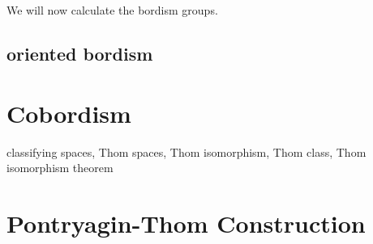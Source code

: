 \documentclass[a4paper,11pt]{article}
\begin{document}
We will now calculate the bordism groups.

\subsection{oriented bordism}

\begin{definition}
\end{definition}

\begin{definition}[orientable]
\end{definition}

\begin{definition}[bordant]
\end{definition}

\begin{definition}
\end{definition}

\section{Cobordism}

classifying spaces, Thom spaces, Thom isomorphism, Thom class, Thom isomorphism theorem

\section{Pontryagin-Thom Construction}

\newpage\printbibliography%
\end{document}
